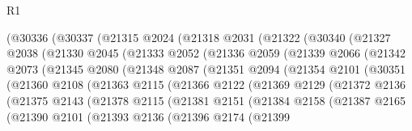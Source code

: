 \begin{lexlean}{R1}
\begin{coremodule}
        (@30336
          (@30337
            (@21315
              @2024
              (@21318
                @2031
                (@21322
                  (@30340
                    (@21327
                      @2038
                      (@21330
                        @2045
                        (@21333
                          @2052
                          (@21336
                            @2059
                            (@21339
                              @2066
                              (@21342
                                @2073
                                (@21345
                                  @2080
                                  (@21348
                                    @2087
                                    (@21351
                                      @2094
                                      (@21354
                                        @2101
                                        (@30351
                                          (@21360
                                            @2108
                                            (@21363
                                              @2115
                                              (@21366
                                                @2122
                                                (@21369
                                                  @2129
                                                  (@21372
                                                    @2136
                                                    (@21375
                                                      @2143
                                                      (@21378
                                                        @2115
                                                        (@21381
                                                          @2151
                                                          (@21384
                                                            @2158
                                                            (@21387
                                                              @2165
                                                              (@21390
                                                                @2101
                                                                (@21393
                                                                  @2136
                                                                  (@21396
                                                                    @2174
                                                                    (@21399

\end{coremodule}
\end{lexlean}

